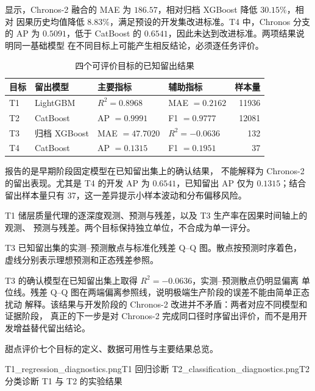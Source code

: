 显示，Chronos-2 融合的 MAE 为 $186.57$，相对归档
XGBoost 降低 $30.15\%$，相对
因果历史均值降低 $8.83\%$，满足预设的开发集改进标准。T4 中，Chronos 分支的
AP 为 $0.5091$，低于 CatBoost 的 $0.6541$，因此未达到改进标准。两项结果说明同一基础模型
在不同目标上可能产生相反结论，必须逐任务评价。

\begin{table}[htbp]
  \centering
  \caption{四个可评价目标的已知留出结果}
  \label{tab:sweetspot-holdout}
  \small
  \begin{tabular}{llllr}
    \toprule
    目标 & 留出模型 & 主要指标 & 辅助指标 & 样本量 \\
    \midrule
    T1 & LightGBM & $R^2=0.8968$ & MAE $=0.2162$ & 11936 \\
    T2 & CatBoost & AP $=0.9991$ & F1 $=0.9777$ & 12081 \\
    T3 & 归档 XGBoost & MAE $=47.7020$ & $R^2=-0.0636$ & 132 \\
    T4 & CatBoost & AP $=0.1315$ & F1 $=0.1951$ & 37 \\
    \bottomrule
  \end{tabular}
\end{table}

报告的是早期阶段固定模型在已知留出集上的确认结果，
不能解释为 Chronos-2 的留出表现。尤其是 T4 的开发 AP 为 $0.6541$，已知留出
AP 仅为 $0.1315$；结合留出样本量只有 37，这一差异提示小样本波动和分布偏移风险。

  {T1 储层质量代理的逐深度观测、预测与残差，以及 T3 生产率在因果时间轴上的观测、
  预测与残差。两个目标保持独立单位，不合成为单一评分。}

  {T3 已知留出集的实测--预测散点与标准化残差 Q--Q 图。散点按预测时序着色，
  虚线分别表示理想预测和正态残差参照。}

T3 的确认模型在已知留出集上取得 $R^2=-0.0636$，实测--预测散点仍明显偏离
单位线。残差 Q--Q 图在两端偏离参照线，说明极端生产阶段的误差不能由简单正态扰动
解释。该结果与开发阶段的 Chronos-2 改进并不矛盾：两者对应不同模型和证据阶段，
真正的下一步是对 Chronos-2 完成同口径时序留出评价，而不是用开发增益替代留出结论。

  {甜点评价七个目标的定义、数据可用性与主要结果总览。}

  {T1_regression_diagnostics.png}{T1 回归诊断}
  {T2_classification_diagnostics.png}{T2 分类诊断}
  {T1 与 T2 的实验结果}

